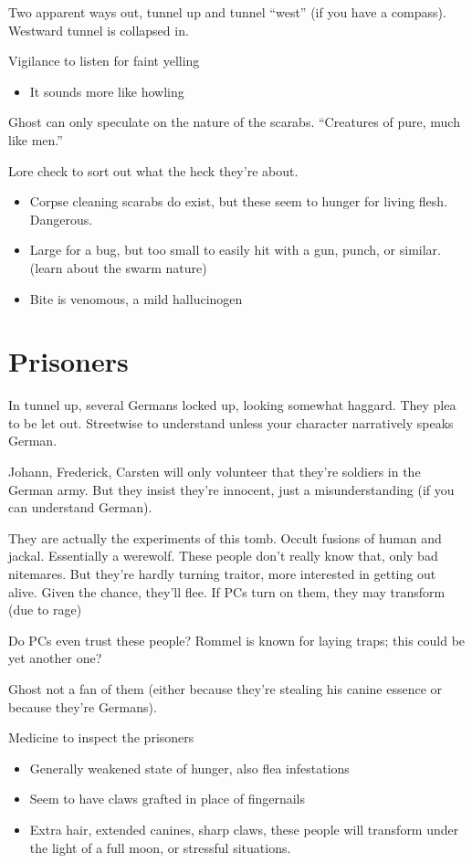 \documentclass{book}
\newcommand{\df}{\DifficultyDie}
\newcommand{\stb}{\SetbackDie}
\begin{document}
\begin{multicols}{2}
Two apparent ways out, tunnel up and tunnel ``west'' (if you have a compass).  Westward tunnel is collapsed in.

\df\df Vigilance to listen for faint yelling
\begin{itemize}
    \item \Advantage It sounds more like howling
\end{itemize}

Ghost can only speculate on the nature of the scarabs.  ``Creatures of pure, much like men.''

\df\df Lore check to sort out what the heck they're about.
    \begin{itemize}
        \item \Success Corpse cleaning scarabs do exist, but these seem to hunger for living flesh.  Dangerous.
        \item \Advantage Large for a bug, but too small to easily hit with a gun, punch, or similar.  (learn about the swarm nature)
        \item \Advantage Bite is venomous, a mild hallucinogen
    \end{itemize}

\section{Prisoners}

In tunnel up, several Germans locked up, looking somewhat haggard.  They plea to be let out.  \df\df Streetwise to understand unless your character narratively speaks German.

Johann, Frederick, Carsten will only volunteer that they're soldiers in the German army.  But they insist they're innocent, just a misunderstanding (if you can understand German).

They are actually the experiments of this tomb.  Occult fusions of human and jackal.  Essentially a werewolf.  These people don't really know that, only bad nitemares.  But they're hardly turning traitor, more interested in getting out alive.  Given the chance, they'll flee.  If PCs turn on them, they may transform (due to rage)

Do PCs even trust these people?  Rommel is known for laying traps; this could be yet another one?

Ghost not a fan of them (either because they're stealing his canine essence or because they're Germans).

\df\df\stb\stb Medicine to inspect the prisoners
    \begin{itemize}
        \item \Success Generally weakened state of hunger, also flea infestations
        \item \Advantage\Advantage Seem to have claws grafted in place of fingernails
        \item \Triumph Extra hair, extended canines, sharp claws, these people will transform under the light of a full moon, or stressful situations.
    \end{itemize}



\end{multicols}
\end{document}

